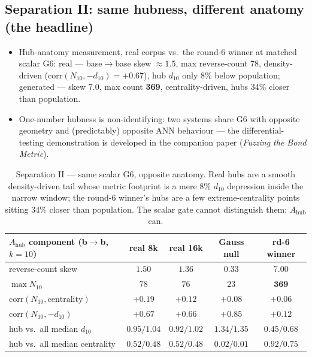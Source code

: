 \documentclass[11pt]{article}
\begin{document}
\subsection{Separation II: same hubness, different anatomy (the headline)}
\begin{itemize}
\item Hub-anatomy measurement, real corpus vs.\ the round-6 winner at matched
  scalar G6: real --- base$\to$base skew $\approx 1.5$, max reverse-count 78,
  density-driven ($\mathrm{corr}(N_{10}, -d_{10}) = +0.67$), hub $d_{10}$ only
  8\% below population; generated --- skew $7.0$, max count \textbf{369},
  centrality-driven, hubs 34\% closer than population.
\item One-number hubness is non-identifying: two systems share G6 with opposite
  geometry and (predictably) opposite ANN behaviour --- the differential-testing
  demonstration is developed in the companion paper (\emph{Fuzzing the Bond
  Metric}).
\end{itemize}

\begin{table}[h]\centering\small
\begin{tabular}{lcccc}
\toprule
$A_{\mathrm{hub}}$ component (b$\to$b, $k{=}10$) & real 8k & real 16k & Gauss null & rd-6 winner \\
\midrule
reverse-count skew          & $1.50$ & $1.36$ & $0.33$ & $\mathbf{7.00}$ \\
$\max N_{10}$               & $78$   & $76$   & $23$   & $\mathbf{369}$ \\
$\mathrm{corr}(N_{10},\text{centrality})$ & $+0.19$ & $+0.12$ & $+0.08$ & $+0.06$ \\
$\mathrm{corr}(N_{10},-d_{10})$           & $+0.67$ & $+0.66$ & $+0.85$ & $+0.12$ \\
hub vs.\ all median $d_{10}$ & $0.95/1.04$ & $0.92/1.02$ & $1.34/1.35$ & $\mathbf{0.45/0.68}$ \\
hub vs.\ all median centrality & $0.52/0.48$ & $0.52/0.48$ & $0.02/0.01$ & $\mathbf{0.92/0.75}$ \\
\bottomrule
\end{tabular}
\caption{Separation II --- same scalar G6, opposite anatomy. Real hubs are a
smooth density-driven tail whose metric footprint is a mere 8\% $d_{10}$
depression inside the narrow window; the round-6 winner's hubs are a few
extreme-centrality points sitting 34\% closer than population. The scalar gate
cannot distinguish them; $A_{\mathrm{hub}}$ can.}
\label{tab:anatomy}
\end{table}
\end{document}
